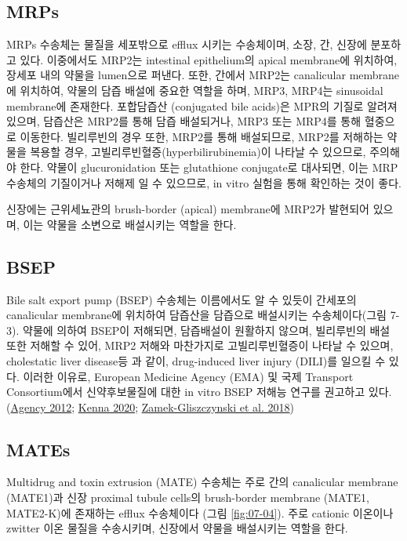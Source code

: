 \documentclass[
  11pt,
  krantz2, a4paper, twoside]{krantz}
\begin{document}
\hypertarget{mrps}{%
\subsection{MRPs}\label{mrps}}

MRPs 수송체는 물질을 세포밖으로 efflux 시키는 수송체이며, 소장, 간,
신장에 분포하고 있다. 이중에서도 MRP2는 intestinal epithelium의 apical
membrane에 위치하여, 장세포 내의 약물을 lumen으로 퍼낸다. 또한, 간에서
MRP2는 canalicular membrane에 위치하여, 약물의 담즙 배설에 중요한 역할을
하며, MRP3, MRP4는 sinusoidal membrane에 존재한다. 포합담즙산
(conjugated bile acids)은 MPR의 기질로 알려져 있으며, 담즙산은 MRP2를
통해 담즙 배설되거나, MRP3 또는 MRP4를 통해 혈중으로 이동한다.
빌리루빈의 경우 또한, MRP2를 통해 배설되므로, MRP2를 저해하는 약물을
복용할 경우, 고빌리루빈혈증(hyperbilirubinemia)이 나타날 수 있으므로,
주의해야 한다. 약물이 glucuronidation 또는 glutathione conjugate로
대사되면, 이는 MRP 수송체의 기질이거나 저해제 일 수 있으므로, in vitro
실험을 통해 확인하는 것이 좋다.

신장에는 근위세뇨관의 brush-border (apical) membrane에 MRP2가 발현되어
있으며, 이는 약물을 소변으로 배설시키는 역할을 한다.

\hypertarget{bsep}{%
\subsection{BSEP}\label{bsep}}

Bile salt export pump (BSEP) 수송체는 이름에서도 알 수 있듯이 간세포의
canalicular membrane에 위치하여 담즙산을 담즙으로 배설시키는
수송체이다(그림 7-3). 약물에 의하여 BSEP이 저해되면, 담즙배설이 원활하지
않으며, 빌리루빈의 배설 또한 저해할 수 있어, MRP2 저해와 마찬가지로
고빌리루빈혈증이 나타날 수 있으며, cholestatic liver disease등 과 같이,
drug-induced liver injury (DILI)를 일으킬 수 있다. 이러한 이유로,
European Medicine Agency (EMA) 및 국제 Transport Consortium에서
신약후보물질에 대한 in vitro BSEP 저해능 연구를 권고하고 있다. (\protect\hyperlink{ref-european2012guideline}{Agency 2012}; \protect\hyperlink{ref-kenna2020sc1}{Kenna 2020}; \protect\hyperlink{ref-zamek2018transporters}{Zamek-Gliszczynski et al. 2018})

\hypertarget{mates}{%
\subsection{MATEs}\label{mates}}

Multidrug and toxin extrusion (MATE) 수송체는 주로 간의 canalicular
membrane (MATE1)과 신장 proximal tubule cells의 brush-border membrane
(MATE1, MATE2-K)에 존재하는 efflux 수송체이다 (그림 \ref{fig:07-04}). 주로 cationic
이온이나 zwitter 이온 물질을 수송시키며, 신장에서 약물을 배설시키는
역할을 한다.
\end{document}
